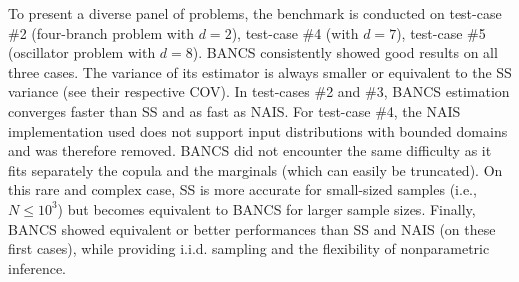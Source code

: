 To present a diverse panel of problems, the benchmark is conducted on test-case \#2 (four-branch problem with $d=2$), test-case \#4 (with $d=7$), test-case \#5 (oscillator problem with $d=8$). 
BANCS consistently showed good results on all three cases. 
The variance of its estimator is always smaller or equivalent to the SS variance (see their respective COV). 
In test-cases \#2 and \#3, BANCS estimation converges faster than SS and as fast as NAIS. 
For test-case \#4, the NAIS implementation used does not support input distributions with bounded domains and was therefore removed. 
BANCS did not encounter the same difficulty as it fits separately the copula and the marginals (which can easily be truncated). 
On this rare and complex case, SS is more accurate for small-sized samples (i.e., $N\leq 10^3$) but becomes equivalent to BANCS for larger sample sizes. 
Finally, BANCS showed equivalent or better performances than SS and NAIS (on these first cases), while providing i.i.d. sampling and the flexibility of nonparametric inference.   

